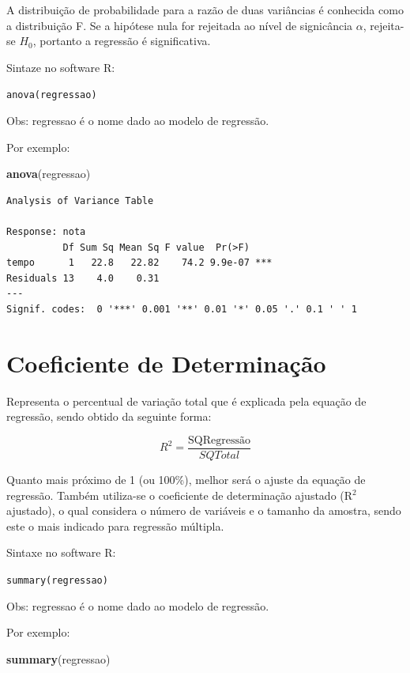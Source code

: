 \documentclass[12pt,brazil,oneside]{book}
\newenvironment{Shaded}{\begin{snugshade}}{\end{snugshade}}
\newcommand{\KeywordTok}[1]{\textcolor[rgb]{0.13,0.29,0.53}{\textbf{#1}}}
\newcommand{\NormalTok}[1]{#1}
\begin{document}
A distribuição de probabilidade para a razão de duas variâncias é conhecida como a distribuição F. Se a hipótese nula for rejeitada ao nível de signicância \(\alpha\), rejeita-se \(H_0\), portanto a regressão é significativa.

Sintaze no software R:

\texttt{anova(regressao)}

Obs: regressao é o nome dado ao modelo de regressão.

Por exemplo:

\begin{Shaded}
\begin{Highlighting}[]
\KeywordTok{anova}\NormalTok{(regressao)}
\end{Highlighting}
\end{Shaded}

\begin{verbatim}
Analysis of Variance Table

Response: nota
          Df Sum Sq Mean Sq F value  Pr(>F)    
tempo      1   22.8   22.82    74.2 9.9e-07 ***
Residuals 13    4.0    0.31                    
---
Signif. codes:  0 '***' 0.001 '**' 0.01 '*' 0.05 '.' 0.1 ' ' 1
\end{verbatim}

\hypertarget{coeficiente-de-determinacao}{%
\section{Coeficiente de Determinação}\label{coeficiente-de-determinacao}}

Representa o percentual de variação total que é explicada pela equação de regressão, sendo obtido da seguinte forma:

\[
R^2 = \frac{\textrm{SQRegressão}}{SQTotal}
\]

Quanto mais próximo de 1 (ou 100\%), melhor será o ajuste da equação de regressão. Também utiliza-se o coeficiente de determinação ajustado (R\(^2\) ajustado), o qual considera o número de variáveis e o tamanho da amostra, sendo este o mais indicado para regressão múltipla.

Sintaxe no software R:

\texttt{summary(regressao)}

Obs: regressao é o nome dado ao modelo de regressão.

Por exemplo:

\begin{Shaded}
\begin{Highlighting}[]
\KeywordTok{summary}\NormalTok{(regressao)}
\end{Highlighting}
\end{Shaded}
\end{document}
